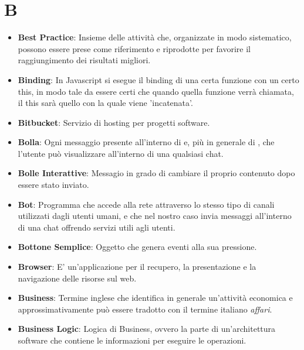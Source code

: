 \section*{B}
\begin{itemize}
	\item
	\textbf{Best Practice}: Insieme delle attività che, organizzate in modo sistematico, possono essere prese come riferimento e riprodotte per favorire il raggiungimento dei risultati migliori.
	\item
	\textbf{Binding}: In Javascript si esegue il binding di una certa funzione con un certo this, in modo tale da essere certi che quando quella funzione verrà chiamata, il this sarà quello con la quale viene 'incatenata'.
	\item
	\textbf{Bitbucket}: Servizio di hosting per progetti software.
	\item
	\textbf{Bolla}: Ogni messaggio presente all'interno di  e, più in generale di , che l'utente può visualizzare all'interno di una qualsiasi chat.
	\item
	\textbf{Bolle Interattive}: Messagio in grado di cambiare il proprio contenuto dopo essere stato inviato.
	\item
	\textbf{Bot}: Programma che accede alla rete attraverso lo stesso tipo di canali utilizzati dagli utenti umani, e che nel nostro caso invia messaggi all'interno di una chat offrendo servizi utili agli utenti.
	\item
	\textbf{Bottone Semplice}: Oggetto che genera eventi alla sua pressione.
	\item
	\textbf{Browser}: E' un'applicazione per il recupero, la presentazione e la navigazione delle risorse sul web.
	\item
	\textbf{Business}: Termine inglese che identifica in generale un'attività economica e approssimativamente può essere tradotto con il termine italiano \textit{affari}.
	\item
	\textbf{Business Logic}: Logica di Business, ovvero la parte di un'architettura software che contiene le informazioni per eseguire le operazioni.
\end{itemize}
\newpage
